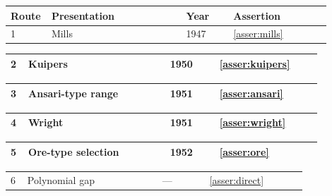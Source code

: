 \documentclass[11pt,reqno]{amsart}
\makeatletter
\newcommand{\SplitTableCaption}{\def\@captype{table}\caption}
\theoremstyle{blueplain}
\newcounter{type}
\newcounter{asser}
\numberwithin{equation}{section}
\makeatother
\begin{document}
{\scriptsize

\begingroup
\SplitTableCaption{Summary of the ten routes and their assertions.}\label{tab:routes}\label{tab:routes-compact}
\par\nobreak
\noindent
\begin{tabular}{|@{}p{0.05844\linewidth}|p{0.40909\linewidth}|p{0.14026\linewidth}|p{0.29221\linewidth}|}\hline
{Route} & {Presentation} & {Year} & {Assertion}\\
\hline
{1} & {Mills} & {1947} & {\cref{asser:mills}}\\
\hline
\end{tabular}%
\par\setlength{\parskip}{0pt}\nointerlineskip
\noindent
\begin{tabular}{|@{}p{0.05844\linewidth}|p{0.40909\linewidth}|p{0.14026\linewidth}|p{0.29221\linewidth}|}\hline
{2} & {Kuipers} & {1950} & {\cref{asser:kuipers}}\\
\hline
\end{tabular}%
\par\setlength{\parskip}{0pt}\nointerlineskip
\noindent
\begin{tabular}{|@{}p{0.05844\linewidth}|p{0.40909\linewidth}|p{0.14026\linewidth}|p{0.29221\linewidth}|}\hline
{3} & {Ansari-type range} & {1951} & {\cref{asser:ansari}}\\
\hline
\end{tabular}%
\par\setlength{\parskip}{0pt}\nointerlineskip
\noindent
\begin{tabular}{|@{}p{0.05844\linewidth}|p{0.40909\linewidth}|p{0.14026\linewidth}|p{0.29221\linewidth}|}\hline
{4} & {Wright} & {1951} & {\cref{asser:wright}}\\
\hline
\end{tabular}%
\par\setlength{\parskip}{0pt}\nointerlineskip
\noindent
\begin{tabular}{|@{}p{0.05844\linewidth}|p{0.40909\linewidth}|p{0.14026\linewidth}|p{0.29221\linewidth}|}\hline
{5} & {Ore-type selection} & {1952} & {\cref{asser:ore}}\\
\hline
\end{tabular}%
\par\setlength{\parskip}{0pt}\nointerlineskip
\noindent
\begin{tabular}{|@{}p{0.05844\linewidth}|p{0.40909\linewidth}|p{0.14026\linewidth}|p{0.29221\linewidth}|}\hline
{6} & {Polynomial gap} & {---} & {\cref{asser:direct}}\\

\end{tabular}}
\end{document}
